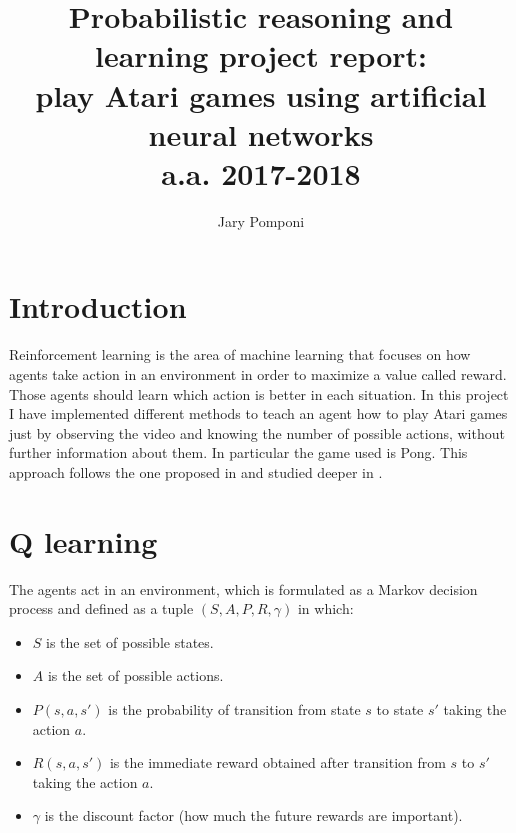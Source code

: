 \documentclass[10pt]{article}
\title{ 
	Probabilistic reasoning and learning project report:  \protect\\ play Atari games using artificial neural networks \protect\\  \large a.a. 2017-2018}
\author{ Jary Pomponi}
\date{\vspace{-5ex}}
\begin{document}
	\maketitle
\begin{multicols}{2}
\section{Introduction}
Reinforcement learning is the area of machine learning that focuses on how agents take action in an environment in order to maximize a value called reward. Those agents should learn which action is better in each situation. In this project I have implemented different methods to teach an agent how to play Atari games just by observing the video and knowing the number of possible actions, without further information about them. In particular the game used is Pong. This approach follows the one proposed in \cite{playAtariGame} and studied deeper in \cite{playAtariGameHuman}.

\section{Q learning}

The agents act in an environment, which is formulated as a Markov decision process and defined as a tuple $(S, A, P, R, \gamma)$ in which:
\begin{itemize}
	\item $S$ is the set of possible states.
	\item $A$ is the set of possible actions.
	\item $P(s, a, s')$ is the probability of transition from state $s$ to state $s'$ taking the action $a$.
	\item $R(s, a, s')$ is the immediate reward obtained after transition from $s$ to $s'$ taking the action $a$.
	\item $\gamma$ is the discount factor (how much the future rewards are important).
\end{itemize}


\end{multicols}
\end{document}
